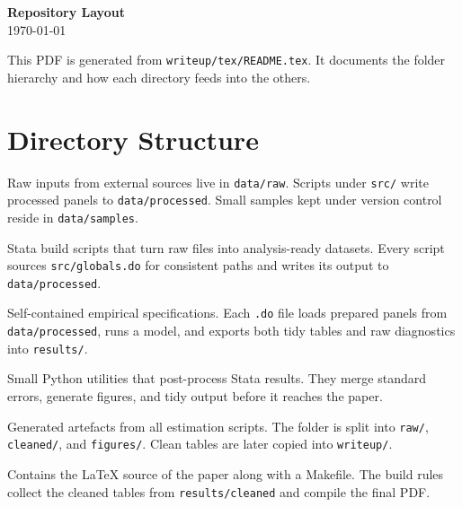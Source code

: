 \documentclass[11pt]{article}
\newcommand{\code}[1]{\texttt{#1}}
\begin{document}
\begin{center}
  {\LARGE \bf Repository Layout}\\[0.5em]
  \today
\end{center}

\vspace{1em}

This PDF is generated from \code{writeup/tex/README.tex}. It documents the
folder hierarchy and how each directory feeds into the others.

\tableofcontents
\newpage

\section{Directory Structure}

\begin{description}[style=unboxed,leftmargin=0.7in]
  \item[\code{data/}] Raw inputs from external sources live in
        \code{data/raw}. Scripts under \code{src/} write processed panels
        to \code{data/processed}. Small samples kept under version control
        reside in \code{data/samples}.

  \item[\code{src/}] Stata build scripts that turn raw files into
        analysis-ready datasets. Every script sources \code{src/globals.do}
        for consistent paths and writes its output to
        \code{data/processed}.

  \item[\code{spec/}] Self-contained empirical specifications. Each
        \code{.do} file loads prepared panels from \code{data/processed},
        runs a model, and exports both tidy tables and raw diagnostics into
        \code{results/}.

  \item[\code{py/}] Small Python utilities that post-process Stata
        results. They merge standard errors, generate figures, and tidy
        output before it reaches the paper.

  \item[\code{results/}] Generated artefacts from all estimation scripts.
        The folder is split into \code{raw/}, \code{cleaned/}, and
        \code{figures/}. Clean tables are later copied into
        \code{writeup/}.

  \item[\code{writeup/}] Contains the \LaTeX{} source of the paper along
        with a Makefile. The build rules collect the cleaned tables from
        \code{results/cleaned} and compile the final PDF.
\end{description}
\end{document}
